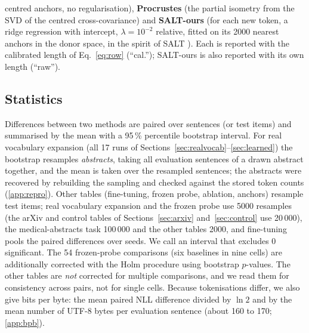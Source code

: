 \documentclass[preprint,12pt]{elsarticle}
\begin{document}
centred anchors, no regularisation), \textbf{Procrustes} (the partial isometry from the SVD of the centred cross-covariance) and \textbf{SALT-ours} (for each new token, a ridge regression with intercept, $\lambda=10^{-2}$ relative, fitted on its 2000 nearest anchors in the donor space, in the spirit of SALT \cite{lee2025salt}). Each is reported with the calibrated length of Eq.~\eqref{eq:row} (``cal.''); SALT-ours is also reported with its own length (``raw'').

\subsection{Statistics}
\label{sec:stats}
Differences between two methods are paired over sentences (or test items) and summarised by the mean with a 95\,\% percentile bootstrap interval. For real vocabulary expansion (all 17 runs of Sections~\ref{sec:realvocab}--\ref{sec:learned}) the bootstrap resamples \emph{abstracts}, taking all evaluation sentences of a drawn abstract together, and the mean is taken over the resampled sentences; the abstracts were recovered by rebuilding the sampling and checked against the stored token counts (\ref{app:repro}). Other tables (fine-tuning, frozen probe, ablation, anchors) resample test items; real vocabulary expansion and the frozen probe use 5000 resamples (the arXiv and control tables of Sections~\ref{sec:arxiv} and~\ref{sec:control} use 20\,000), the medical-abstracts task 100\,000 and the other tables 2000, and fine-tuning pools the paired differences over seeds. We call an interval that excludes 0 significant. The 54 frozen-probe comparisons (six baselines in nine cells) are additionally corrected with the Holm procedure \cite{holm1979simple} using bootstrap $p$-values. The other tables are \emph{not} corrected for multiple comparisons, and we read them for consistency across pairs, not for single cells. Because tokenisations differ, we also give bits per byte: the mean paired NLL difference divided by $\ln 2$ and by the mean number of UTF-8 bytes per evaluation sentence (about 160 to 170; \ref{app:bpb}).
\end{document}
